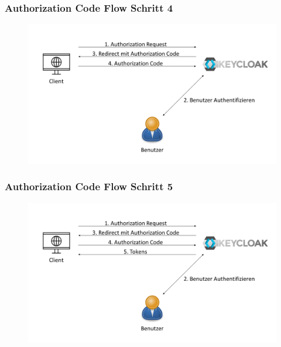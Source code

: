 \documentclass{beamer}
\begin{document}
\begin{frame}
\frametitle{Authorization Code Flow Schritt 4}
\begin{figure}
\centerfloat
\includegraphics[width=1.1\linewidth]{img/authflow4.png}
\end{figure}
\end{frame}

\begin{frame}
\frametitle{Authorization Code Flow Schritt 5}
\begin{figure}
\centerfloat
\includegraphics[width=1.1\linewidth]{img/authflow5.png}
\end{figure}
\end{frame}
\end{document}
